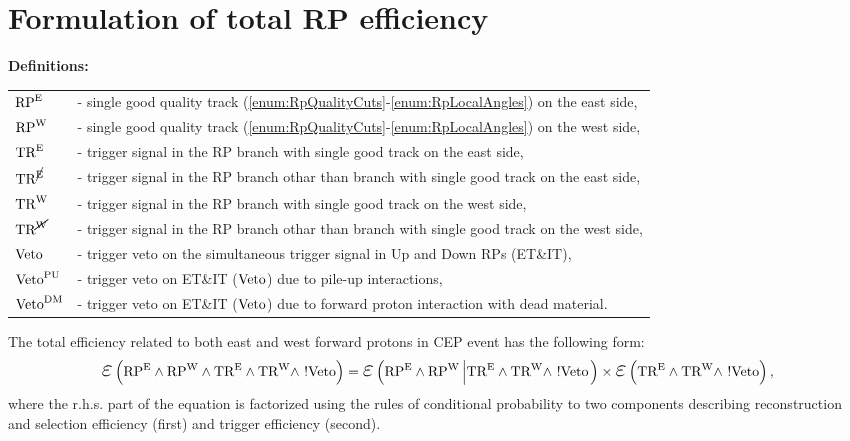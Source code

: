 
\chapter{Formulation of total RP efficiency}\label{appendix:totalRpEffFormulation}


\textbf{Definitions:}\\[7pt]
\begin{tabular}{ll}
$\text{RP}^{\text{E}}$ &- single good quality track (\ref{enum:RpQualityCuts}-\ref{enum:RpLocalAngles}) on the east side,\\
$\text{RP}^{\text{W}}$ & - single good quality track (\ref{enum:RpQualityCuts}-\ref{enum:RpLocalAngles}) on the west side,\\
$\text{TR}^{\text{E}}$ & - trigger signal in the RP branch with single good track on the east side,\\
$\text{TR}^{\cancel{\text{E}}}$ & - trigger signal in the RP branch othar than branch with single good track on the east side,\\
$\text{TR}^{\text{W}}$ & - trigger signal in the RP branch with single good track on the west side,\\
$\text{TR}^{\cancel{\text{W}}}$ & - trigger signal in the RP branch othar than branch with single good track on the west side,\\
$\text{Veto}$ & - trigger veto on the simultaneous trigger signal in Up and Down RPs (ET\&IT),\\
$\text{Veto}^{\text{PU}}$ & - trigger veto on ET\&IT ($\text{Veto}$) due to pile-up interactions,\\
$\text{Veto}^{\text{DM}}$ & - trigger veto on ET\&IT ($\text{Veto}$) due to forward proton interaction with dead material.\\ 
\end{tabular}\vspace{10pt}


The total efficiency related to both east and west forward protons in CEP event has the following form:
\begin{equation}
\mbox{\LARGE$\varepsilon$}\left(\RPE\land\RPW\land\TRE\land\TRW\land~!\V\right) = \mbox{\LARGE$\varepsilon$}\left(\RPE\land\RPW\left|\TRE\land\TRW\land~!\V\right.\right)\times\mbox{\LARGE$\varepsilon$}\left(\TRE\land\TRW\land~!\V\right),
\end{equation}
where the r.h.s. part of the equation is factorized using the rules of conditional probability to two components describing reconstruction and selection efficiency (first) and trigger efficiency (second).



